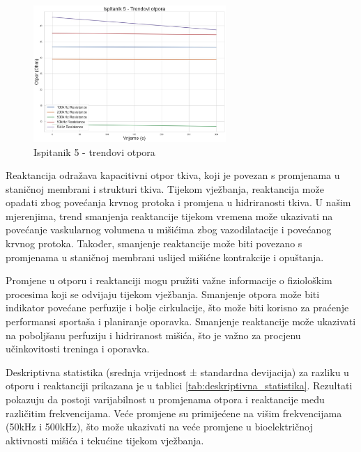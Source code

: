 \documentclass[../diplomski_rad.tex]{subfiles}
\begin{document}
\begin{figure}[htb]
    \centering
    \includegraphics[width=0.65\textwidth]{Figures/trend.jpeg} 
    \caption{Ispitanik 5 - trendovi otpora}
    \label{slk:trend}
\end{figure}

Reaktancija odražava kapacitivni otpor tkiva, koji je povezan s promjenama u staničnoj membrani i strukturi tkiva. 
Tijekom vježbanja, reaktancija može opadati zbog povećanja krvnog protoka i promjena u hidriranosti tkiva. 
U našim mjerenjima, trend smanjenja reaktancije tijekom vremena može ukazivati na povećanje 
vaskularnog volumena u mišićima zbog vazodilatacije i povećanog krvnog protoka. 
Također, smanjenje reaktancije može biti povezano s promjenama u staničnoj membrani uslijed mišićne kontrakcije i opuštanja.

Promjene u otporu i reaktanciji mogu pružiti važne informacije o 
fiziološkim procesima koji se odvijaju tijekom vježbanja. 
Smanjenje otpora može biti indikator povećane perfuzije i bolje cirkulacije, 
što može biti korisno za praćenje performansi sportaša i planiranje oporavka. 
Smanjenje reaktancije može ukazivati na poboljšanu perfuziju i hidriranost mišića, 
što je važno za procjenu učinkovitosti treninga i oporavka.

Deskriptivna statistika (srednja vrijednost ± standardna devijacija) 
za razliku u otporu i reaktanciji prikazana je u tablici \ref{tab:deskriptivna_statistika}. 
Rezultati pokazuju da postoji varijabilnost u promjenama otpora i reaktancije među različitim frekvencijama. 
Veće promjene su primijećene na višim frekvencijama (50kHz i 500kHz), 
što može ukazivati na veće promjene u bioelektričnoj aktivnosti mišića i tekućine tijekom vježbanja.
\end{document}
